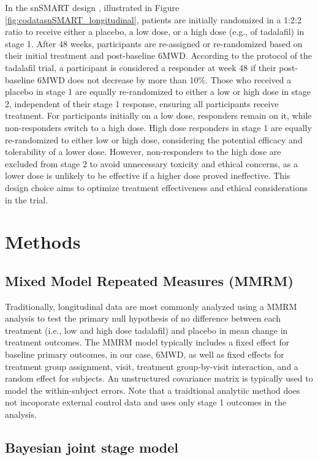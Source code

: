 In the \ac{snSMART} design \citep{wang2023dynamic}, illustrated in Figure \ref{fig:codatasnSMART_longitudinal}, patients are initially randomized in a 1:2:2 ratio to receive either a placebo, a low dose, or a high dose (e.g., of tadalafil) in stage 1. After 48 weeks, participants are re-assigned or re-randomized based on their initial treatment and post-baseline 6MWD. According to the protocol of the tadalafil trial, a participant is considered a responder at week 48 if their post-baseline \ac{6MWD} does not decrease by more than 10\%. Those who received a placebo in stage 1 are equally re-randomized to either a low or high dose in stage 2, independent of their stage 1 response, ensuring all participants receive treatment. For participants initially on a low dose, responders remain on it, while non-responders switch to a high dose. High dose responders in stage 1 are equally re-randomized to either low or high dose, considering the potential efficacy and tolerability of a lower dose. However, non-responders to the high dose are excluded from stage 2 to avoid unnecessary toxicity and ethical concerns, as a lower dose is unlikely to be effective if a higher dose proved ineffective. This design choice aims to optimize treatment effectiveness and ethical considerations in the trial.

\section{Methods}
\label{sec:methods}

\subsection{Mixed Model Repeated Measures (MMRM)}
Traditionally, longitudinal data are most commonly analyzed using a \ac{MMRM} analysis to test the primary null hypothesis of no difference between each treatment (i.e., low and high dose tadalafil) and placebo in mean change in treatment outcomes. The \ac{MMRM} model typically includes a fixed effect for baseline primary outcomes, in our case, 6MWD, as well as fixed effects for treatment group assignment, visit, treatment group-by-visit interaction, and a random effect for subjects. An unstructured covariance matrix is typically used to model the within-subject errors. Note that a traidtional analytiic method does not incoporate external control data and uses only stage 1 outcomes in the analysis.

\subsection{Bayesian joint stage model}

